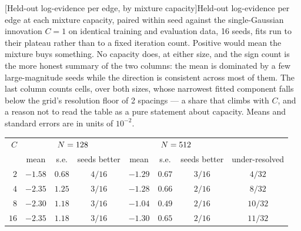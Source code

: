 
\begin{center}
\begin{minipage}{\linewidth}\small\centering
{}[Held-out log-evidence per edge, by mixture capacity]{Held-out log-evidence per edge at each mixture capacity,
paired within seed against the single-Gaussian innovation $C=1$ on identical
training and evaluation data, 16 seeds, fits run to their plateau rather
than to a fixed iteration count. Positive would mean the mixture buys something.
No capacity does, at either size, and the sign count is the more honest summary of
the two columns: the mean is dominated by a few large-magnitude seeds while the
direction is consistent across most of them. The last column counts cells, over
both sizes, whose narrowest fitted component falls below the grid's resolution
floor of 2 spacings --- a share that climbs with $C$, and a
reason not to read the table as a pure statement about capacity. Means and
standard errors are in units of $10^{-2}$.}
\label{tab:capacity}
\begin{tabular}{@{}rccccccc@{}}
\toprule
$C$ & \multicolumn{3}{c}{$N = 128$} & \multicolumn{3}{c}{$N = 512$} & \\
 & mean & s.e. & seeds better & mean & s.e. & seeds better & under-resolved \\
\midrule
$2$ & $-1.58$ & $0.68$ & $4/16$ & $-1.29$ & $0.67$ & $3/16$ & $4/32$ \\
$4$ & $-2.35$ & $1.25$ & $3/16$ & $-1.28$ & $0.66$ & $2/16$ & $8/32$ \\
$8$ & $-2.30$ & $1.18$ & $3/16$ & $-1.04$ & $0.49$ & $2/16$ & $10/32$ \\
$16$ & $-2.35$ & $1.18$ & $3/16$ & $-1.30$ & $0.65$ & $2/16$ & $11/32$ \\
\bottomrule
\end{tabular}
\end{minipage}
\end{center}
